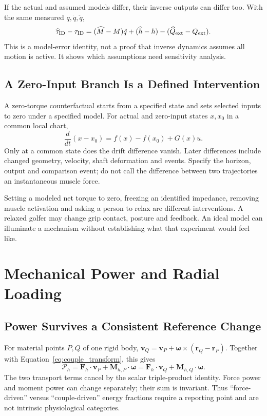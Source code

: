 \documentclass[11pt,a4paper]{article}
\newcommand{\vect}[1]{\boldsymbol{#1}}
\begin{document}
If the actual and assumed models differ, their inverse outputs can differ too. With the same measured $q,\dot q,\ddot q$,
\begin{equation}
\widehat\tau_{\rm ID}-\tau_{\rm ID}
=(\widehat M-M)\ddot q+(\widehat h-h)
-(\widehat Q_{\rm ext}-Q_{\rm ext}).
\end{equation}
This is a model-error identity, not a proof that inverse dynamics assumes all motion is active. It shows which assumptions need sensitivity analysis.

\subsection{A Zero-Input Branch Is a Defined Intervention}
A zero-torque counterfactual starts from a specified state and sets selected inputs to zero under a specified model. For actual and zero-input states $x,x_0$ in a common local chart,
\begin{equation}
\frac{d}{dt}(x-x_0)=f(x)-f(x_0)+G(x)u.
\end{equation}
Only at a common state does the drift difference vanish. Later differences include changed geometry, velocity, shaft deformation and events. Specify the horizon, output and comparison event; do not call the difference between two trajectories an instantaneous muscle force.

Setting a modeled net torque to zero, freezing an identified impedance, removing muscle activation and asking a person to relax are different interventions. A relaxed golfer may change grip contact, posture and feedback. An ideal model can illuminate a mechanism without establishing what that experiment would feel like.

\section{Mechanical Power and Radial Loading}
\subsection{Power Survives a Consistent Reference Change}
For material points $P,Q$ of one rigid body,
$\vect v_Q=\vect v_P+\vect\omega\times(\vect r_Q-\vect r_P)$.
Together with Equation~\ref{eq:couple_transform}, this gives
\begin{equation}
\mathcal P_h=\vect F_h\cdot\vect v_P+\vect M_{h,P}\cdot\vect\omega
=\vect F_h\cdot\vect v_Q+\vect M_{h,Q}\cdot\vect\omega.
\label{eq:power}
\end{equation}
The two transport terms cancel by the scalar triple-product identity. Force power and moment power can change separately; their sum is invariant. Thus ``force-driven'' versus ``couple-driven'' energy fractions require a reporting point and are not intrinsic physiological categories.
\end{document}
